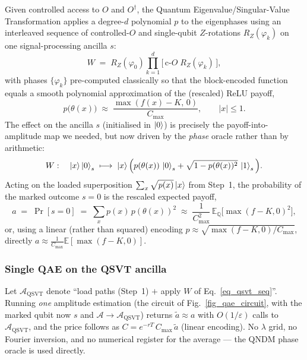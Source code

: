 \documentclass{article}
\begin{document}
Given controlled access to $O$ and $O^\dagger$, the Quantum Eigenvalue/Singular-Value Transformation \cite{gilyen2019qsvt,martyn2021grand} applies a degree-$d$ polynomial $p$ to the eigenphases using an interleaved sequence of controlled-$O$ and single-qubit $Z$-rotations $R_Z(\varphi_k)$ on one signal-processing ancilla $s$:
\begin{equation}\label{eq_qsvt_seq}
W \;=\; R_Z(\varphi_0)\prod_{k=1}^{d}\Big[\,\text{c-}O\;R_Z(\varphi_k)\,\Big],
\end{equation}
with phases $\{\varphi_k\}$ pre-computed classically so that the block-encoded function equals a smooth polynomial approximation of the (rescaled) ReLU payoff,
\begin{equation}\label{eq_relu_poly}
p\big(\theta(x)\big) \;\approx\; \frac{\max(f(x)-K,\,0)}{C_{\max}}, \qquad |x|\le 1 .
\end{equation}
The effect on the ancilla $s$ (initialised in $\ket{0}$) is precisely the payoff-into-amplitude map we needed, but now driven by the \emph{phase} oracle rather than by arithmetic:
\begin{equation}\label{eq_qsvt_state}
W:\quad \ket{x}\ket{0}_s \;\longmapsto\; \ket{x}\Big(p(\theta(x))\,\ket{0}_s + \sqrt{1-p(\theta(x))^2}\,\ket{1}_s\Big).
\end{equation}
Acting on the loaded superposition $\sum_x\sqrt{p(x)}\ket{x}$ from Step~1, the probability of the marked outcome $s=0$ is the rescaled expected payoff,
\begin{equation}\label{eq_qsvt_amp}
a \;=\; \Pr[s=0] \;=\; \sum_x p(x)\,p(\theta(x))^2 \;\approx\; \frac{1}{C_{\max}^2}\,\mathbb{E}_{\mathbb{Q}}\!\big[\max(f-K,0)^2\big],
\end{equation}
or, using a linear (rather than squared) encoding $p\approx\sqrt{\max(f-K,0)/C_{\max}}$, directly $a\approx \tfrac{1}{C_{\max}}\mathbb{E}[\max(f-K,0)]$.

\subsubsection{Single QAE on the QSVT ancilla}

Let $\mathcal{A}_{\text{QSVT}}$ denote ``load paths (Step~1) $+$ apply $W$ of Eq.~\eqref{eq_qsvt_seq}''. Running \emph{one} amplitude estimation (the circuit of Fig.~\ref{fig_qae_circuit}, with the marked qubit now $s$ and $\mathcal{A}\to\mathcal{A}_{\text{QSVT}}$) returns $\tilde a\approx a$ with $O(1/\varepsilon)$ calls to $\mathcal{A}_{\text{QSVT}}$, and the price follows as $C=e^{-rT}\,C_{\max}\,\tilde a$ (linear encoding). No $\lambda$ grid, no Fourier inversion, and no numerical register for the average --- the QNDM phase oracle is used directly.
\end{document}
